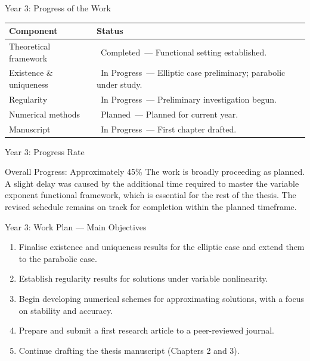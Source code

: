 \documentclass[11pt]{beamer}
\newcommand{\completed}{\textcolor{accentgreen}{\faCheckCircle\ Completed}}
\newcommand{\inprogress}{\textcolor{warningorange}{\faHourglassHalf\ In Progress}}
\newcommand{\planned}{\textcolor{primaryblue}{\faClock\ Planned}}
\begin{document}
	\begin{frame}{Year 3: Progress of the Work}
		\begin{table}[h!]
			\centering
			\renewcommand{\arraystretch}{1.4}
			\small
			\begin{tabular}{@{}p{} p{}@{}}
				\toprule
				\textbf{Component} & \textbf{Status} \\
				\midrule
				Theoretical framework & \completed\ — Functional setting established. \\
				Existence \& uniqueness & \inprogress\ — Elliptic case preliminary; parabolic under study. \\
				Regularity & \inprogress\ — Preliminary investigation begun. \\
				Numerical methods & \planned\ — Planned for current year. \\
				Manuscript & \inprogress\ — First chapter drafted. \\
				\bottomrule
			\end{tabular}
		\end{table}
	\end{frame}
	
	\begin{frame}{Year 3: Progress Rate}
		\begin{block}{Overall Progress: Approximately 45\%}
			The work is broadly proceeding as planned. A slight delay was caused by the additional time required to master the variable exponent functional framework, which is essential for the rest of the thesis. The revised schedule remains on track for completion within the planned timeframe.
		\end{block}
	\end{frame}
	
	\begin{frame}{Year 3: Work Plan — Main Objectives}
		\begin{enumerate}
			\item Finalise existence and uniqueness results for the elliptic case and extend them to the parabolic case.
			\item Establish regularity results for solutions under variable nonlinearity.
			\item Begin developing numerical schemes for approximating solutions, with a focus on stability and accuracy.
			\item Prepare and submit a first research article to a peer-reviewed journal.
			\item Continue drafting the thesis manuscript (Chapters 2 and 3).
		\end{enumerate}
	\end{frame}
	
\end{document}
